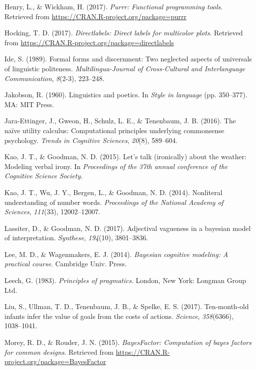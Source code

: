 \documentclass[floatsintext,man]{apa6}
\theoremstyle{definition}
\theoremstyle{definition}
\theoremstyle{definition}
\theoremstyle{remark}
\begin{document}
\hypertarget{ref-R-purrr}{}
Henry, L., \& Wickham, H. (2017). \emph{Purrr: Functional programming
tools}. Retrieved from \url{https://CRAN.R-project.org/package=purrr}

\hypertarget{ref-R-directlabels}{}
Hocking, T. D. (2017). \emph{Directlabels: Direct labels for multicolor
plots}. Retrieved from
\url{https://CRAN.R-project.org/package=directlabels}

\hypertarget{ref-ide1989}{}
Ide, S. (1989). Formal forms and discernment: Two neglected aspects of
universals of linguistic politeness. \emph{Multilingua-Journal of
Cross-Cultural and Interlanguage Communication}, \emph{8}(2-3),
223--248.

\hypertarget{ref-jakobson1960}{}
Jakobson, R. (1960). Linguistics and poetics. In \emph{Style in
language} (pp. 350--377). MA: MIT Press.

\hypertarget{ref-jara2016naive}{}
Jara-Ettinger, J., Gweon, H., Schulz, L. E., \& Tenenbaum, J. B. (2016).
The naïve utility calculus: Computational principles underlying
commonsense psychology. \emph{Trends in Cognitive Sciences},
\emph{20}(8), 589--604.

\hypertarget{ref-kao2015}{}
Kao, J. T., \& Goodman, N. D. (2015). Let's talk (ironically) about the
weather: Modeling verbal irony. In \emph{Proceedings of the 37th annual
conference of the Cognitive Science Society}.

\hypertarget{ref-kao2014}{}
Kao, J. T., Wu, J. Y., Bergen, L., \& Goodman, N. D. (2014). Nonliteral
understanding of number words. \emph{Proceedings of the National Academy
of Sciences}, \emph{111}(33), 12002--12007.

\hypertarget{ref-lassiter2017adjectival}{}
Lassiter, D., \& Goodman, N. D. (2017). Adjectival vagueness in a
bayesian model of interpretation. \emph{Synthese}, \emph{194}(10),
3801--3836.

\hypertarget{ref-lee2014}{}
Lee, M. D., \& Wagenmakers, E. J. (2014). \emph{Bayesian cognitive
modeling: A practical course}. Cambridge Univ. Press.

\hypertarget{ref-leech1983}{}
Leech, G. (1983). \emph{Principles of pragmatics}. London, New York:
Longman Group Ltd.

\hypertarget{ref-liu2017ten}{}
Liu, S., Ullman, T. D., Tenenbaum, J. B., \& Spelke, E. S. (2017).
Ten-month-old infants infer the value of goals from the costs of
actions. \emph{Science}, \emph{358}(6366), 1038--1041.

\hypertarget{ref-R-BayesFactor}{}
Morey, R. D., \& Rouder, J. N. (2015). \emph{BayesFactor: Computation of
bayes factors for common designs}. Retrieved from
\url{https://CRAN.R-project.org/package=BayesFactor}
\end{document}
